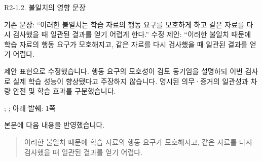 \begin{reviewitem}{R2-1.2. 불일치의 영향 문장}

\begin{reviewercomment}

기존 문장: ``이러한 불일치는 학습 자료의 행동 요구를 모호하게 하고 같은 자료를 다시 검사했을 때 일관된 결과를 얻기 어렵게 한다.'' 수정 제안: ``이러한 불일치 때문에 학습 자료의 행동 요구가 모호해지고, 같은 자료를 다시 검사했을 때 일관된 결과를 얻기 어렵다.

\end{reviewercomment}

\begin{authorresponse}

제안 표현으로 수정했습니다. 행동 요구의 모호성이 검토 동기임을 설명하되 이번 검사로 실제 학습 성능이 향상됐다고 주장하지 않습니다. 명시된 의무·증거의 일관성과 차량 안전 및 학습 효과를 구분했습니다.

\end{authorresponse}

\begin{manuscriptrevision}{; ; 아래 발췌: 1쪽}

본문에 다음 내용을 반영했습니다.

\begin{quote}

이러한 불일치 때문에 학습 자료의 행동 요구가 모호해지고, 같은 자료를 다시 검사했을 때 일관된 결과를 얻기 어렵다.

\end{quote}

\end{manuscriptrevision}

\end{reviewitem}

\clearpage

